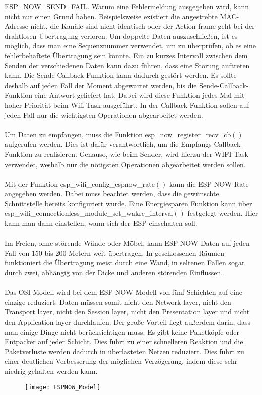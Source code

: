 \documentclass[titlepage,12pt,twoside]{article}
\begin{document}
ESP\_NOW\_SEND\_FAIL. Warum eine Fehlermeldung ausgegeben wird, kann nicht 
nur einen Grund haben. Beispielsweise existiert die angestrebte MAC-Adresse 
nicht, die Kanäle sind nicht identisch oder der Action frame geht bei der 
drahtlosen Übertragung verloren. Um doppelte Daten auszuschließen, ist es 
möglich, dass man eine Sequenznummer verwendet, um zu überprüfen, ob es eine 
fehlerbehaftete Übertragung sein könnte. Ein zu kurzes Intervall zwischen 
dem Senden der verschiedenen Daten kann dazu führen, dass eine Störung 
auftreten kann. Die Sende-Callback-Funktion kann dadurch gestört werden. Es 
sollte deshalb auf jeden Fall der Moment abgewartet werden, bis die Sende-Callback-Funktion 
eine Antwort geliefert hat. Dabei wird diese Funktion jedes Mal mit hoher 
Priorität beim Wifi-Task ausgeführt. In der Callback-Funktion sollen auf 
jeden Fall nur die wichtigsten Operationen abgearbeitet werden. \\
\\
Um Daten zu empfangen, muss die Funktion esp\_now\_register\_recv\_cb$()$ aufgerufen 
werden. Dies ist dafür verantwortlich, um die Empfangs-Callback-Funktion zu 
realisieren. Genauso, wie beim Sender, wird hierzu der WIFI-Task verwendet, 
weshalb nur die nötigsten Operationen abgearbeitet werden sollen. \\
\\
Mit der Funktion esp\_wifi\_config\_espnow\_rate$()$ kann die ESP-NOW Rate angegeben 
werden. Dabei muss beachtet werden, dass die gewünschte Schnittstelle bereits 
konfiguriert wurde. Eine Energiesparen Funktion kann über 
esp\_wifi\_connectionless\_module\_set\_wakre\_interval$()$ festgelegt werden. Hier 
kann man dann einstellen, wann sich der ESP einschalten soll. \\
\\
Im Freien, ohne störende Wände oder Möbel, kann ESP-NOW Daten auf jeden Fall von 150 
bis 200 Metern weit übertragen. In geschlossenen Räumen funktioniert die Übertragung 
meist durch eine Wand, in seltenen Fällen sogar durch zwei, abhängig von der Dicke 
und anderen störenden Einflüssen. \\
\\
Das OSI-Modell wird bei dem ESP-NOW Modell von fünf Schichten auf eine 
einzige reduziert. Daten müssen somit nicht den Network layer, nicht den 
Transport layer, nicht den Session layer, nicht den Presentation layer und 
nicht den Application layer durchlaufen. Der große Vorteil liegt außerdem 
darin, dass man einige Dinge nicht berücksichtigen muss. Es gibt keine 
Paketköpfe oder Entpacker auf jeder Schicht. Dies führt zu einer schnelleren 
Reaktion und die Paketverluste werden dadurch in überlasteten Netzen 
reduziert. Dies führt zu einer deutlichen Verbesserung der möglichen 
Verzögerung, indem diese sehr niedrig gehalten werden kann. \\
\begin{figure}[H]
	\begin{center}
		\scalebox{1.0}
		{\texttt{[image: ESPNOW\_Model]}}
	\end{center}
\end{figure}
\end{document}
